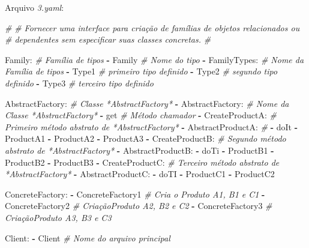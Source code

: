 \documentclass[]{article}
\newenvironment{Shaded}{}{}
\newcommand{\KeywordTok}[1]{\textcolor[rgb]{0.00,0.44,0.13}{\textbf{{#1}}}}
\newcommand{\CommentTok}[1]{\textcolor[rgb]{0.38,0.63,0.69}{\textit{{#1}}}}
\newcommand{\FunctionTok}[1]{\textcolor[rgb]{0.02,0.16,0.49}{{#1}}}
\newcommand{\NormalTok}[1]{{#1}}
\begin{document}
\clearpage
Arquivo \emph{3.yaml}:

\begin{Shaded}
\begin{Highlighting}[]
\CommentTok{#}
\CommentTok{# Fornecer uma interface para criação de famílias de objetos relacionados ou}
\CommentTok{# dependentes sem especificar suas classes concretas.}
\CommentTok{#}

\FunctionTok{Family:}                      \CommentTok{# Família de tipos}
\KeywordTok{-} \NormalTok{Family                     }\CommentTok{# Nome do tipo}
\KeywordTok{-} \FunctionTok{FamilyTypes:}               \CommentTok{# Nome da Família de tipos}
    \KeywordTok{-} \NormalTok{Type1                  }\CommentTok{# primeiro tipo definido}
    \KeywordTok{-} \NormalTok{Type2                  }\CommentTok{# segundo tipo definido}
    \KeywordTok{-} \NormalTok{Type3                  }\CommentTok{# terceiro tipo definido}

\FunctionTok{AbstractFactory:}            \CommentTok{# Classe *AbstractFactory* }
\KeywordTok{-} \FunctionTok{AbstractFactory:}          \CommentTok{# Nome da Classe *AbstractFactory*}
    \KeywordTok{-} \NormalTok{get                   }\CommentTok{# Método chamador}
    \KeywordTok{-} \FunctionTok{CreateProductA:}       \CommentTok{# Primeiro método abstrato de *AbstractFactory*}
        \KeywordTok{-} \FunctionTok{AbstractProductA:} \CommentTok{#}
            \KeywordTok{-} \NormalTok{doIt}
            \KeywordTok{-} \NormalTok{ProductA1}
            \KeywordTok{-} \NormalTok{ProductA2}
            \KeywordTok{-} \NormalTok{ProductA3}
    \KeywordTok{-} \FunctionTok{CreateProductB:}       \CommentTok{# Segundo método abstrato de *AbstractFactory*}
        \KeywordTok{-} \FunctionTok{AbstractProductB:}
            \KeywordTok{-} \NormalTok{doTi}
            \KeywordTok{-} \NormalTok{ProductB1}
            \KeywordTok{-} \NormalTok{ProductB2}
            \KeywordTok{-} \NormalTok{ProductB3}
    \KeywordTok{-} \FunctionTok{CreateProductC:}       \CommentTok{# Terceiro método abstrato de *AbstractFactory*}
        \KeywordTok{-} \FunctionTok{AbstractProductC:}
            \KeywordTok{-} \NormalTok{doTI}
            \KeywordTok{-} \NormalTok{ProductC1}
            \KeywordTok{-} \NormalTok{ProductC2}

\FunctionTok{ConcreteFactory:}
\KeywordTok{-} \NormalTok{ConcreteFactory1          }\CommentTok{# Cria o Produto A1, B1 e C1}
\KeywordTok{-} \NormalTok{ConcreteFactory2          }\CommentTok{# CriaçãoProduto A2, B2 e C2}
\KeywordTok{-} \NormalTok{ConcreteFactory3          }\CommentTok{# CriaçãoProduto A3, B3 e C3}

\FunctionTok{Client:}
\KeywordTok{-} \NormalTok{Client                    }\CommentTok{# Nome do arquivo principal}
\end{Highlighting}
\end{Shaded}
\end{document}
